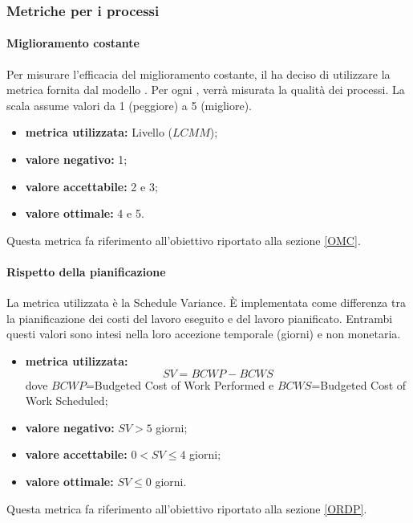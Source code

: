 			\subsubsection{Metriche per i processi}
				\paragraph{Miglioramento costante}
				\label{MMC}
					Per misurare l'efficacia del miglioramento costante, il  ha deciso di utilizzare la metrica fornita dal modello . Per ogni , verrà misurata la qualità dei processi. La scala assume valori da 1 (peggiore) a 5 (migliore).
					\begin{itemize}
						\item \textbf{metrica utilizzata:} Livello  ($LCMM$);
						\item \textbf{valore negativo:} 1;
						\item \textbf{valore accettabile:} 2 e 3;
						\item \textbf{valore ottimale:} 4 e 5.
					\end{itemize}
				Questa metrica fa riferimento all'obiettivo riportato alla sezione \ref{OMC}.
				
				\paragraph{Rispetto della pianificazione}
				\label{MRDP}
				La metrica utilizzata è la Schedule Variance. È implementata come differenza 
				tra la pianificazione dei costi del lavoro eseguito e del lavoro pianificato. Entrambi questi valori sono intesi nella loro accezione temporale (giorni) e non monetaria.
				\begin{itemize}
					\item \textbf{metrica utilizzata:} $$SV = BCWP-BCWS$$
					dove $BCWP$=Budgeted Cost of Work Performed e $BCWS$=Budgeted Cost of Work Scheduled;
					\item \textbf{valore negativo:} $SV>5$ giorni;
					\item \textbf{valore accettabile:} $0<SV\leq 4$ giorni;
					\item \textbf{valore ottimale:} $SV\leq0$ giorni.
				\end{itemize}
				Questa metrica fa riferimento all'obiettivo riportato alla sezione \ref{ORDP}.
			
